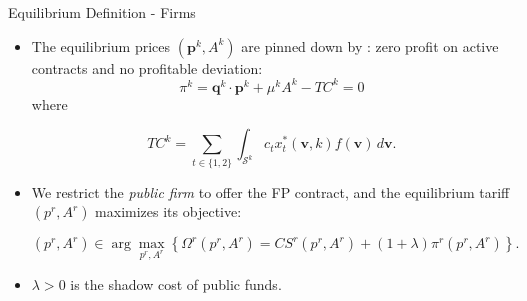 \documentclass{class}
\begin{document}
\begin{frame}{Equilibrium Definition - Firms}


\begin{itemize}

\item The equilibrium prices $(\mathbf{p}^k,A^k)$ are pinned down by : zero profit on active contracts and no profitable deviation:
\vfill
    \begin{equation*}
        \pi^k  = \mathbf{q}^k \cdot \mathbf{p}^k  +  \mu^k A^k -  TC^k = 0
    \end{equation*}
 where 

\begin{equation*}
    TC^k
    =
    \sum_{t\in\{1,2\}}
    \int_{\mathcal{S}^k}
    c_t x_t^*(\mathbf{v}, k) f(\mathbf{v}) \, d\mathbf{v}.
\end{equation*}

\vfill
\item We restrict the \textit{public firm} to offer the FP contract, and the equilibrium tariff
$(p^r,A^r)$ maximizes its objective:

\vfill
\[
    (p^r,A^r)\in 
    \arg\max_{p^r,A^r}
    \left\{
    \Omega^r(p^r,A^r)
    =
    CS^r(p^r,A^r)
    + (1+\lambda) \pi^r(p^r,A^r)
    \right\}.
\]

\vfill

\item $\lambda>0$ is the shadow cost of public funds.

\end{itemize}

\end{frame}




\end{document}

